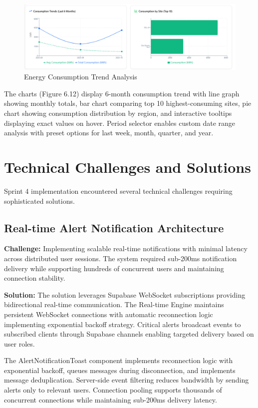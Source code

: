 \begin{figure}[H]
    \centering
    \includegraphics[width=0.9\linewidth]{img/chap_06/screenshot_energy_charts.png}
    \caption{Energy Consumption Trend Analysis}
    \label{fig:energy_charts}
\end{figure}

The charts (Figure 6.12) display 6-month consumption trend with line graph showing monthly totals, bar chart comparing top 10 highest-consuming sites, pie chart showing consumption distribution by region, and interactive tooltips displaying exact values on hover. Period selector enables custom date range analysis with preset options for last week, month, quarter, and year.

\section{Technical Challenges and Solutions}

Sprint 4 implementation encountered several technical challenges requiring sophisticated solutions.

\subsection{Real-time Alert Notification Architecture}

\textbf{Challenge:} Implementing scalable real-time notifications with minimal latency across distributed user sessions. The system required sub-200ms notification delivery while supporting hundreds of concurrent users and maintaining connection stability.

\textbf{Solution:} The solution leverages Supabase WebSocket subscriptions providing bidirectional real-time communication. The Real-time Engine maintains persistent WebSocket connections with automatic reconnection logic implementing exponential backoff strategy. Critical alerts broadcast events to subscribed clients through Supabase channels enabling targeted delivery based on user roles.

The AlertNotificationToast component implements reconnection logic with exponential backoff, queues messages during disconnection, and implements message deduplication. Server-side event filtering reduces bandwidth by sending alerts only to relevant users. Connection pooling supports thousands of concurrent connections while maintaining sub-200ms delivery latency.

